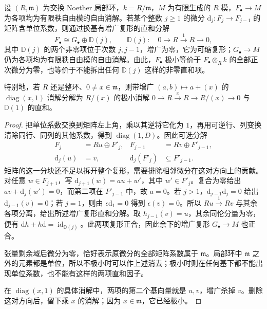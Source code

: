 \begin{proposition}[单位系数的消去]\label{b3:prop:unit-cancellation}
	设 \((R,\mathfrak m)\) 为交换 Noether 局部环，\(k=R/\mathfrak m\)，\(M\) 为有限生成的 \(R\) 模，\(F_\bullet\to M\) 为各项均为有限秩自由模的自由消解。若某个整数 \(j\ge1\) 的微分 \(\mathrm{d}_j:F_j\to F_{j-1}\) 的矩阵含单位系数，则通过换基有增广复形的直和分解
	\[
		F_\bullet\cong G_\bullet\oplus\mathbb D(j),\qquad \mathbb D(j):\quad0\longrightarrow R\xrightarrow{1}R\longrightarrow0,
	\]
	其中 \(\mathbb D(j)\) 的两个非零项位于次数 \(j,j-1\)，增广为零，它为可缩复形；\(G_\bullet\to M\) 仍为各项均为有限秩自由模的自由消解。由此，\(F_\bullet\) 极小等价于 \(F_\bullet\otimes_Rk\) 的全部正次微分为零，也等价于不能拆出任何 \(\mathbb D(j)\) 这样的非零直和项。

	特别地，若 \(R\) 还是整环、\(0\ne x\in\mathfrak m\)，则带增广 \((a,b)\mapsto a+(x)\) 的 \(\operatorname{diag}(x,1)\) 消解分解为 \(R/(x)\) 的极小消解 \(0\to R\xrightarrow{x}R\to R/(x)\to0\) 与 \(\mathbb D(1)\) 的直和。
\end{proposition}
\begin{proof}
	把单位系数交换到矩阵左上角，乘以其逆将它化为 \(1\)，再用可逆行、列变换清除同行、同列的其他系数，得到 \(\operatorname{diag}(1,D)\)。因此可选分解
	\[
		\begin{aligned}
			F_j&=Ru\oplus F'_j,& F_{j-1}&=Rv\oplus F'_{j-1},\\
			\mathrm{d}_j(u)&=v,& \mathrm{d}_j(F'_j)&\subseteq F'_{j-1}.
		\end{aligned}
	\]
	矩阵的这一分块还不足以拆开整个复形，需要排除相邻微分在这对方向上的贡献。对任意 \(w\in F_{j+1}\)，写 \(\mathrm{d}_{j+1}(w)=au+w'\)，其中 \(w'\in F'_j\)。复合为零给出 \(av+\mathrm{d}_j(w')=0\)，而第二项在 \(F'_{j-1}\) 中，故 \(a=0\)。若 \(j>1\)，\(\mathrm{d}_{j-1}\mathrm{d}_j=0\) 给出 \(\mathrm{d}_{j-1}(v)=0\)；若 \(j=1\)，则由 \(\epsilon\mathrm{d}_1=0\) 得到 \(\epsilon(v)=0\)。所以 \(Ru\xrightarrow{1}Rv\) 与其余各项分离，给出所述增广复形直和分解。取 \(h_{j-1}(v)=u\)，其余同伦分量为零，便有 \(\mathrm{d}h+h\mathrm{d}=\operatorname{id}_{\mathbb D(j)}\)。此两项复形正合，因此余下的增广复形 \(G_\bullet\to M\) 也正合。

	张量剩余域后微分为零，恰好表示原微分的全部矩阵系数属于 \(\mathfrak m\)。局部环中 \(\mathfrak m\) 之外的元素都是单位，所以不极小时可以作上述消去；极小时则在任何基下都不能出现单位系数，也不能有这样的两项直和因子。

	在 \(\operatorname{diag}(x,1)\) 的具体消解中，两项的第二个基向量就是 \(u,v\)，增广杀掉 \(v\)。删除这对方向后，留下乘 \(x\) 的消解；因为 \(x\in\mathfrak m\)，它已经极小。
\end{proof}

